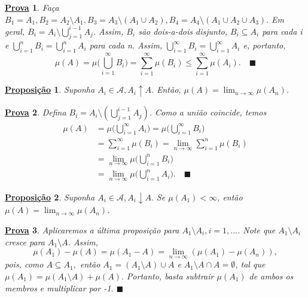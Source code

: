 \documentclass{article}
\newtheorem*{prop*}{\underline{Proposi\c c\~ao}}
\newtheorem*{proof*}{\underline{Prova}}
\renewcommand\qedsymbol{$\blacksquare$}
\begin{document}
\begin{proof*}
	Faça \(B_{1} = A_{1}, B_2 = A_2\setminus{A_1}, B_3 = A_3\setminus{(A_1\cup A_2)}, B_4 = A_4\setminus{(A_1\cup A_2\cup A_3)}.\)  Em geral, \(B_{i} = A_{i}\setminus{\bigcup_{j=1}^{i-1}A_{j}}\).
	Assim, \(B_{i}\) são dois-a-dois disjunto, \(B_{i}\subseteq A_{i}\) para cada i e \(\bigcup_{i=1}^{n}B_{i} = \bigcup_{i=1}^{n}A_{i}\) para cada n. Assim, \(\bigcup_{i=1}^{\infty}B_{i} = \bigcup_{i=1}^{\infty}A_{i}\) e, portanto,
	\[
		\mu(A) = \mu \biggl(\bigcup_{i=1}^{\infty}B_{i}\biggr) = \sum\limits_{i=1}^{\infty}\mu(B_{i}) \leq \sum\limits_{i=1}^{\infty}\mu (A_{i}).\quad \text{\qedsymbol}
	\]
\end{proof*}
\begin{prop*}
	Suponha \(A_{i}\in \mathcal{A}, A_{i}\uparrow A.\) Então, \(\mu (A) = \lim_{n\to \infty}\mu (A_{n})\).
\end{prop*}
\begin{proof*}
	Defina \(B_{i} = A_{i}\setminus{(\bigcup_{j=1}^{i-1}A_{j})}\). Como a união coincide, temos
	\begin{align*}
		\mu (A) & = \mu \biggl(\bigcup_{i=1}^{\infty}A_{i}\biggr) = \mu \biggl(\bigcup_{i=1}^{\infty}B_{i}\biggr) \\
		        & = \sum\limits_{i=1}^{\infty}\mu (B_{i}) = \lim_{n\to \infty}\sum\limits_{i=1}^{n}\mu (B_{i})    \\
		        & = \lim_{n\to \infty}\mu \biggl(\bigcup_{i=1}^{n}B_{i}\biggr)                                    \\
		        & = \lim_{n\to \infty}\mu \biggl(\bigcup_{i=1}^{n}A_{i}\biggr).\quad \text{\qedsymbol}
	\end{align*}
\end{proof*}
\begin{prop*}
	Suponha \(A_{i}\in \mathcal{A}, A_{i}\downarrow A.\) Se \(\mu (A_1) < \infty\), então \(\mu (A) = \lim_{n\to \infty}\mu (A_{n})\).
\end{prop*}
\begin{proof*}
	Aplicaremos a última proposição para \(A_1\setminus{A_{i}}, i = 1, \dotsc \). Note que \(A_1\setminus{A_{i}}\) cresce para \(A_1\setminus{A}\). Assim,
	\[
		\mu (A_1) - \mu (A) = \mu (A_1 - A) = \lim_{n\to \infty}(\mu (A_1) - \mu (A_{n})),
	\]
	pois, como \(A\subseteq A_1, \) então \(A_1 = (A_1\setminus{A})\cup A\) e \(A_1\setminus{A}\cap A = \emptyset \), tal que \(\mu (A_1) = \mu (A_1\setminus{A}) + \mu (A).\)
	Portanto, basta subtrair \(\mu (A_1)\) de ambos os membros e multiplicar por -1. \qedsymbol

\end{proof*}
\end{document}
